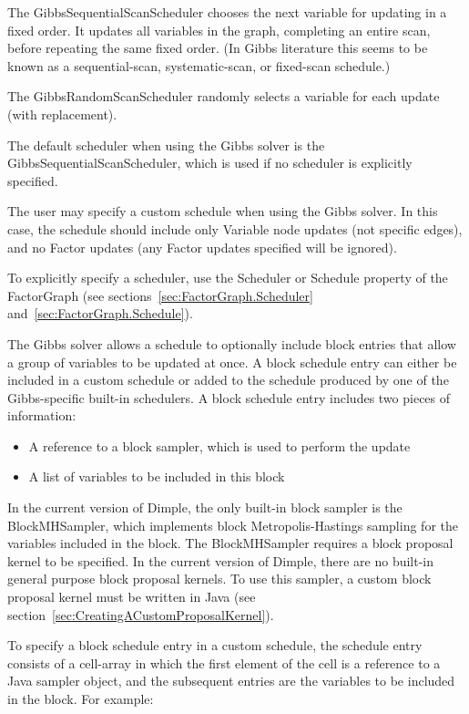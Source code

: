 The GibbsSequentialScanScheduler chooses the next variable for updating in a fixed order. It updates all variables in the graph, completing an entire scan, before repeating the same fixed order. (In Gibbs literature this seems to be known as a sequential-scan, systematic-scan, or fixed-scan schedule.)

The GibbsRandomScanScheduler randomly selects a variable for each update (with replacement).

The default scheduler when using the Gibbs solver is the GibbsSequentialScanScheduler, which is used if no scheduler is explicitly specified.

The user may specify a custom schedule when using the Gibbs solver.  In this case, the schedule should include only Variable node updates (not specific edges), and no Factor updates (any Factor updates specified will be ignored).

To explicitly specify a scheduler, use the Scheduler or Schedule property of the FactorGraph (see sections~\ref{sec:FactorGraph.Scheduler} and~\ref{sec:FactorGraph.Schedule}).

\label{sec:BlockScheduleEntries}

The Gibbs solver allows a schedule to optionally include block entries that allow a group of variables to be updated at once.  A block schedule entry can either be included in a custom schedule or added to the schedule produced by one of the Gibbs-specific built-in schedulers.  A block schedule entry includes two pieces of information:
%
\begin{itemize}
\item A reference to a block sampler, which is used to perform the update
\item A list of variables to be included in this block
\end{itemize}

In the current version of Dimple, the only built-in block sampler is the BlockMHSampler, which implements block Metropolis-Hastings sampling for the variables included in the block.  The BlockMHSampler requires a block proposal kernel to be specified.  In the current version of Dimple, there are no built-in general purpose block proposal kernels.  To use this sampler, a custom block proposal kernel must be written \ifmatlab in Java \fi (see section~\ref{sec:CreatingACustomProposalKernel}).

\ifmatlab
To specify a block schedule entry in a custom schedule, the schedule entry consists of a cell-array in which the first element of the cell is a reference to a Java sampler object, and the subsequent entries are the variables to be included in the block.  For example:

